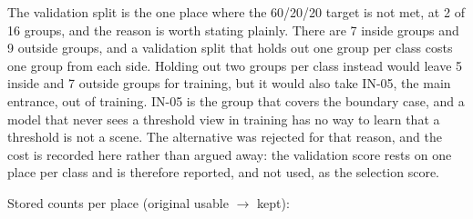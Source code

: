 \documentclass[11pt,a4paper]{article}
\begin{document}
The validation split is the one place where the 60/20/20 target is not met, at 2 of 16 groups, and the reason is worth stating plainly. There are 7 inside groups and 9 outside groups, and a validation split that holds out one group per class costs one group from each side. Holding out two groups per class instead would leave 5 inside and 7 outside groups for training, but it would also take IN-05, the main entrance, out of training. IN-05 is the group that covers the boundary case, and a model that never sees a threshold view in training has no way to learn that a threshold is not a scene. The alternative was rejected for that reason, and the cost is recorded here rather than argued away: the validation score rests on one place per class and is therefore reported, and not used, as the selection score.

Stored counts per place (original usable \ensuremath{\rightarrow} kept):
\end{document}
